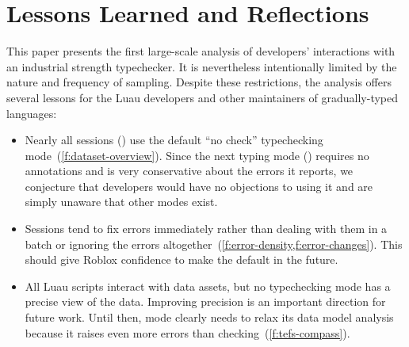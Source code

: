 \documentclass[english,submission,cleveref]{programming}
\begin{document}




\section{Lessons Learned and Reflections}
\label{s:conclusion}

This paper presents the first large-scale analysis of developers' interactions with
an industrial strength typechecker. It is nevertheless intentionally
limited by the nature and frequency of sampling. Despite these restrictions,
the analysis offers several lessons for the Luau
developers and other maintainers of gradually-typed languages:
\begin{itemize}
  \item
    Nearly all sessions () use the default ``no check''
    typechecking mode~(\cref{f:dataset-overview}).
    Since the next typing mode (\mnonstrict{}) requires no annotations and is
    very conservative about the errors it reports, we conjecture that
    developers would have no objections to using it and are simply unaware that
    other modes exist.
  \item
    Sessions tend to fix errors immediately rather than dealing with them in a batch
    or ignoring the errors altogether~(\cref{f:error-density,f:error-changes}).
    This should give Roblox confidence to make \mnonstrict{} the default in the future.
  \item
    All Luau scripts interact with data assets, but no typechecking mode
    has a precise view of the data.
    Improving precision is an important direction for future work.
    Until then, \mstrict{} mode clearly needs to relax its data model
    analysis because it raises even more errors than \FS{} checking~(\cref{f:tefs-compass}).
\end{itemize}
\end{document}
